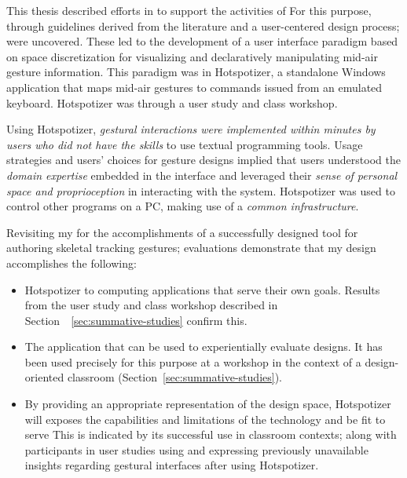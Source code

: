 This thesis described efforts in  to support the activities of  For this purpose, through guidelines derived from the literature and a user-centered design process;  were uncovered. These led to the development of a user interface paradigm based on space discretization for visualizing and declaratively manipulating mid-air gesture information. This paradigm was  in Hotspotizer, a standalone Windows application that maps mid-air gestures to commands issued from an emulated keyboard. Hotspotizer was  through a user study and class workshop.

 Using Hotspotizer, \emph{gestural interactions were implemented within minutes by users who did not have the skills} to use textual programming tools. Usage strategies and users' choices for gesture designs implied that users understood the \emph{domain expertise} embedded in the interface and leveraged their \emph{sense of personal space and proprioception} in interacting with the system. Hotspotizer was used to control other programs on a PC, making use of a \emph{common infrastructure}.

Revisiting my  for the accomplishments of a successfully designed tool for authoring skeletal tracking gestures; evaluations demonstrate that my design accomplishes the following:

\begin{itemize}
\item Hotspotizer  to computing applications that serve their own goals. Results from the user study and class workshop described in Section~~\ref{sec:summative-studies} confirm this.
\item The application  that can be used to experientially evaluate designs. It has been used precisely for this purpose at a workshop in the context of a design-oriented classroom (Section~\ref{sec:summative-studies}).
\item By providing an appropriate representation of the design space, Hotspotizer will exposes the capabilities and limitations of the technology and be fit to serve  This is indicated by its successful use in classroom contexts; along with participants in user studies using and expressing previously unavailable insights regarding gestural interfaces after using Hotspotizer.
\end{itemize}

